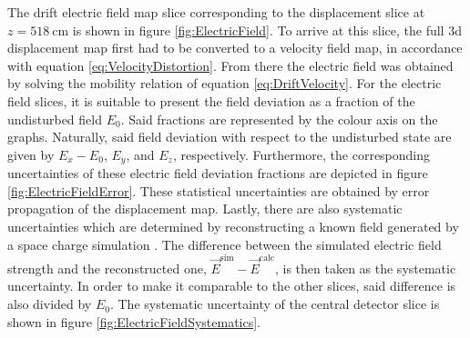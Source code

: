 The drift electric field map slice corresponding to the displacement slice at $z=\SI{518}{\centi\metre}$ is shown in figure \ref{fig:ElectricField}. To arrive at this slice, the full \gls{3d} displacement map first had to be converted to a velocity field map, in accordance with equation \ref{eq:VelocityDistortion}. From there the electric field was obtained by solving the mobility relation of equation \ref{eq:DriftVelocity}. For the electric field slices, it is suitable to present the field deviation as a fraction of the undisturbed field $E_0$. Said fractions are represented by the colour axis on the graphs. Naturally, said field deviation with respect to the undisturbed state are given by $E_x-E_0$, $E_y$, and $E_z$, respectively. Furthermore, the corresponding uncertainties of these electric field deviation fractions are depicted in figure \ref{fig:ElectricFieldError}. These statistical uncertainties are obtained by error propagation of the displacement map. Lastly, there are also systematic uncertainties which are determined by reconstructing a known field generated by a space charge simulation \cite{LArLaserMicroBooNE2}. The difference between the simulated electric field strength and the reconstructed one, \ie $\vec{E}^{\text{sim}} - \vec{E}^{\text{calc}}$, is then taken as the systematic uncertainty. In order to make it comparable to the other slices, said difference is also divided by $E_0$. The systematic uncertainty of the central detector slice is shown in figure \ref{fig:ElectricFieldSystematics}.
